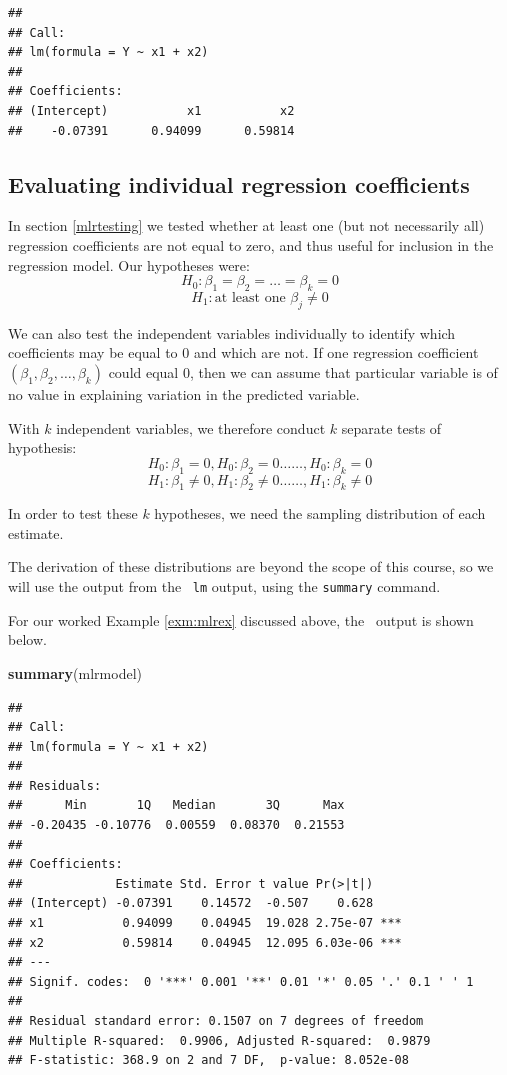 \documentclass[12pt,a4paper,openany,twoside]{report}
\newenvironment{Shaded}{\begin{snugshade}}{\end{snugshade}}
\newcommand{\KeywordTok}[1]{\textcolor[rgb]{0.13,0.29,0.53}{\textbf{#1}}}
\newcommand{\NormalTok}[1]{#1}
\theoremstyle{definition}
\theoremstyle{remark}
\theoremstyle{plain}
\newcommand{\sR}[1]{\textbf{R}\,}
\theoremstyle{definition}
\theoremstyle{definition}
\theoremstyle{definition}
\theoremstyle{remark}
\begin{document}
\begin{verbatim}
## 
## Call:
## lm(formula = Y ~ x1 + x2)
## 
## Coefficients:
## (Intercept)           x1           x2  
##    -0.07391      0.94099      0.59814
\end{verbatim}

\hypertarget{mlrindividual}{%
\subsection{Evaluating individual regression coefficients}\label{mlrindividual}}

In section \ref{mlrtesting} we tested whether at least one (but not necessarily
all) regression coefficients are not equal to zero, and thus useful for
inclusion in the regression model. Our hypotheses were:
\[H_{0}:\beta_{1} = \beta_{2} = \ldots = \beta_{k} = 0\]
\[H_{1}:\mbox{at least one } \beta_{j} \neq 0\]

We can also test the independent variables individually to identify
which coefficients may be equal to 0 and which are not. If one
regression coefficient \((\beta_{1},\beta_{2},\ldots, \beta_{k})\) could equal 0,
then we can assume that particular variable is of no value in explaining
variation in the predicted variable.

With \(k\) independent variables, we therefore conduct \(k\) separate tests of hypothesis:
\[H_{0}:\beta_{1} = 0, H_{0}:\beta_{2} = 0 \ldots{}\ldots{}, H_{0}:\beta_{k} = 0\]
\[H_{1}:\beta_{1} \neq 0, H_{1}:\beta_{2} \neq 0 \ldots{}\ldots{}, H_{1}:\beta_{k} \neq 0\]

In order to test these \(k\) hypotheses, we need the sampling distribution of each estimate.

The derivation of these distributions are beyond the scope of this course, so we will use the output from the \sR~\texttt{lm} output, using the \texttt{summary} command.

For our worked Example \ref{exm:mlrex} discussed above, the \sR~output is shown below.

\newpage

\begin{Shaded}
\begin{Highlighting}[]
\KeywordTok{summary}\NormalTok{(mlrmodel)}
\end{Highlighting}
\end{Shaded}

\begin{verbatim}
## 
## Call:
## lm(formula = Y ~ x1 + x2)
## 
## Residuals:
##      Min       1Q   Median       3Q      Max 
## -0.20435 -0.10776  0.00559  0.08370  0.21553 
## 
## Coefficients:
##             Estimate Std. Error t value Pr(>|t|)    
## (Intercept) -0.07391    0.14572  -0.507    0.628    
## x1           0.94099    0.04945  19.028 2.75e-07 ***
## x2           0.59814    0.04945  12.095 6.03e-06 ***
## ---
## Signif. codes:  0 '***' 0.001 '**' 0.01 '*' 0.05 '.' 0.1 ' ' 1
## 
## Residual standard error: 0.1507 on 7 degrees of freedom
## Multiple R-squared:  0.9906, Adjusted R-squared:  0.9879 
## F-statistic: 368.9 on 2 and 7 DF,  p-value: 8.052e-08
\end{verbatim}
\end{document}
